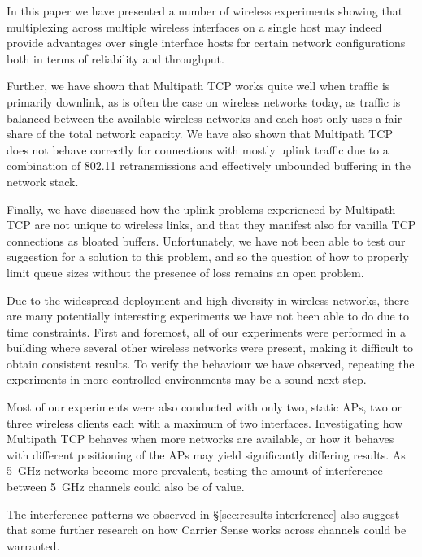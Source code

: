 In this paper we have presented a number of wireless experiments showing that
multiplexing across multiple wireless interfaces on a single host may indeed
provide advantages over single interface hosts for certain network
configurations both in terms of reliability and throughput.

Further, we have shown that Multipath TCP works quite well when traffic is
primarily downlink, as is often the case on wireless networks today, as traffic
is balanced between the available wireless networks and each host only uses a
fair share of the total network capacity. We have also shown that Multipath TCP
does not behave correctly for connections with mostly uplink traffic due to a
combination of 802.11 retransmissions and effectively unbounded buffering in the
network stack.

Finally, we have discussed how the uplink problems experienced by Multipath TCP
are not unique to wireless links, and that they manifest also for vanilla TCP
connections as bloated buffers. Unfortunately, we have not been able to test our
suggestion for a solution to this problem, and so the question of how to
properly limit queue sizes without the presence of loss remains an open problem.

Due to the widespread deployment and high diversity in wireless networks, there
are many potentially interesting experiments we have not been able to do due to
time constraints. First and foremost, all of our experiments were performed in
a building where several other wireless networks were present, making it
difficult to obtain consistent results. To verify the behaviour we have
observed, repeating the experiments in more controlled environments may be a
sound next step.

Most of our experiments were also conducted with only two, static APs, two or
three wireless clients each with a maximum of two interfaces. Investigating how
Multipath TCP behaves when more networks are available, or how it behaves with
different positioning of the APs may yield significantly differing results. As
5~GHz networks become more prevalent, testing the amount of interference between
5~GHz channels could also be of value.

The interference patterns we observed in \S\ref{sec:results-interference} also
suggest that some further research on how Carrier Sense works across channels
could be warranted.

